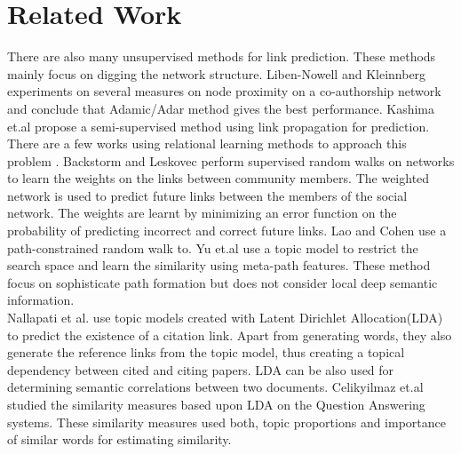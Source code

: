\documentclass{article} %
\begin{document}
\section{Related Work}
There are also many unsupervised methods for link prediction.  These methods mainly focus on digging the network structure. Liben-Nowell and Kleinnberg \cite{Liben-Nowell2007} experiments on several measures on node proximity on a co-authorship network and conclude that Adamic/Adar method gives the best performance. Kashima et.al \cite{Kashima2009} propose a semi-supervised method using link propagation for prediction.\\
There are a few works using relational learning methods to approach this problem \cite{Taskar2003,Popescul2003}. Backstorm and Leskovec \cite{Backstrom:2011:SRW:1935826.1935914} perform supervised random walks on networks to learn the weights on the links between community members. The weighted network is used to predict future links between the members of the social network. The weights are learnt by minimizing an error function on the probability of predicting incorrect and correct future links. Lao and Cohen \cite{Lao2010} use a path-constrained random walk to. Yu et.al \cite{Yu2012} use a topic model to restrict the search space and learn the similarity using meta-path features. These method focus on sophisticate path formation but does not consider local deep semantic information. \\
Nallapati et al. \cite{nallapati2008joint} use topic models created with Latent Dirichlet Allocation(LDA) \cite{blei2003latent} to predict the existence of a citation link. Apart from generating words, they also generate the reference links from the topic model, thus creating a topical dependency between cited and citing papers. LDA can be also used for determining semantic correlations between two documents. Celikyilmaz et.al \cite{Celikyilmaz:2010:LBS:1867767.1867768} studied the similarity measures based upon LDA on the Question Answering systems. These similarity measures used both, topic proportions and importance of similar words for estimating similarity.\\
\end{document}
